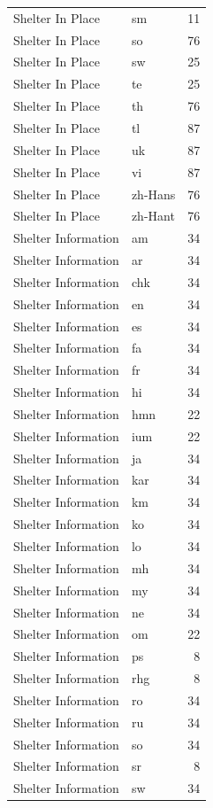 \begin{longtable}{p{3cm} p{3cm} r}
Shelter In Place & sm & 11 \\
Shelter In Place & so & 76 \\
Shelter In Place & sw & 25 \\
Shelter In Place & te & 25 \\
Shelter In Place & th & 76 \\
Shelter In Place & tl & 87 \\
Shelter In Place & uk & 87 \\
Shelter In Place & vi & 87 \\
Shelter In Place & zh-Hans & 76 \\
Shelter In Place & zh-Hant & 76 \\
Shelter Information & am & 34 \\
Shelter Information & ar & 34 \\
Shelter Information & chk & 34 \\
Shelter Information & en & 34 \\
Shelter Information & es & 34 \\
Shelter Information & fa & 34 \\
Shelter Information & fr & 34 \\
Shelter Information & hi & 34 \\
Shelter Information & hmn & 22 \\
Shelter Information & ium & 22 \\
Shelter Information & ja & 34 \\
Shelter Information & kar & 34 \\
Shelter Information & km & 34 \\
Shelter Information & ko & 34 \\
Shelter Information & lo & 34 \\
Shelter Information & mh & 34 \\
Shelter Information & my & 34 \\
Shelter Information & ne & 34 \\
Shelter Information & om & 22 \\
Shelter Information & ps & 8 \\
Shelter Information & rhg & 8 \\
Shelter Information & ro & 34 \\
Shelter Information & ru & 34 \\
Shelter Information & so & 34 \\
Shelter Information & sr & 8 \\
Shelter Information & sw & 34 \\

\end{longtable}
